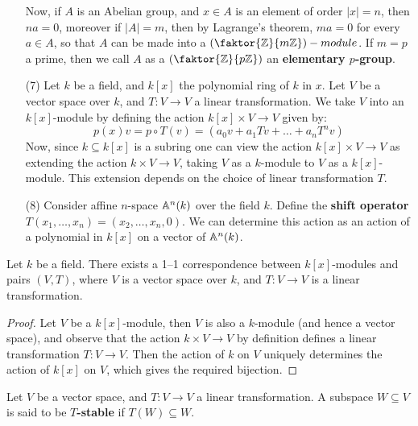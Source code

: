 \begin{definition}
\begin{example}
\begin{enumerate}
      Now, if  $A$ is an Abelian group, and  $x \in A$ is an element
      of order $|x|=n$, then  $na=0$, moreover if $|A|=m$, then by
      Lagrange's theorem, $ma=0$ for every $a \in A$, so that $A$ can
      be made into a  $(\faktor{\Z}{m\Z})-module$. If $m=p$ a prime,
      then we call $A$ as a $(\faktor{\Z}{p\Z})$ an \textbf{elementary
      $p$-group}.

    \item[(7)] Let $k$ be a field, and $k[x]$ the polynomial ring of
      $k$ in $x$. Let $V$ be a vector space over $k$, and $T:V
      \xrightarrow{} V$ a linear transformation. We take $V$ into an
      $k[x]$-module by defining the action $k[x] \times V
      \xrightarrow{} V$ given by:
      \begin{equation*}
        p(x)v=p \circ T(v)=(a_0v+a_1Tv+\dots+a_nT^nv)
      \end{equation*}
      Now, since $k \subseteq k[x]$ is a subring one can view the
      action $k[x] \times V \xrightarrow{} V$ as extending the
      action $k \times V \xrightarrow{} V$, taking $V$ as a
      $k$-module to $V$ as a  $k[x]$-module. This extension depends on
      the choice of linear transformation $T$.

    \item[(8)] Consider affine $n$-space $\mathbb{A}^n(k)$ over the field $k$.
      Define the \textbf{shift operator} $T(x_1, \dots, x_n)=(x_2,
      \dots, x_n, 0)$. We can determine this action as an action of a
      polynomial in $k[x]$ on a vector of $\mathbb{A}^n(k)$.
  \end{enumerate}
\end{example}

\begin{lemma}\label{lemma_4.1.1}
  Let $k$ be a field. There exists a 1--1 correspondence between
  $k[x]$-modules and pairs $(V,T)$, where $V$ is a vector space over
  $k$, and $T:V \xrightarrow{} V$ is a linear transformation.
\end{lemma}
\begin{proof}
  Let $V$ be a $k[x]$-module, then $V$ is also a $k$-module (and hence
  a vector space), and observe that the action $k \times V
  \xrightarrow{} V$ by definition defines a linear transformation $T:V
  \xrightarrow{} V$. Then the action of $k$ on $V$ uniquely determines
  the action of $k[x]$ on $V$, which gives the required bijection.
\end{proof}

\begin{definition}
  Let $V$ be a vector space, and  $T:V \xrightarrow{} V$ a linear
  transformation. A subspace $W \subseteq V$ is said to be
  \textbf{$T$-stable} if $T(W) \subseteq W$.
\end{definition}


\end{definition}
